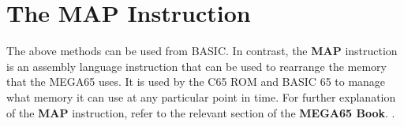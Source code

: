 \section{The MAP Instruction}

The above methods can be used from BASIC. In contrast, the {\bf MAP} instruction is an assembly
language instruction that can be used to rearrange the memory that the MEGA65 uses.
It is used by the C65 ROM and BASIC 65 to manage what memory it can use at any particular
point in time.  For further explanation of the {\bf MAP} instruction,
refer to the relevant section of
\ifdefined\printmanual
 the {\bf MEGA65 Book}.
\else
 .
\fi



